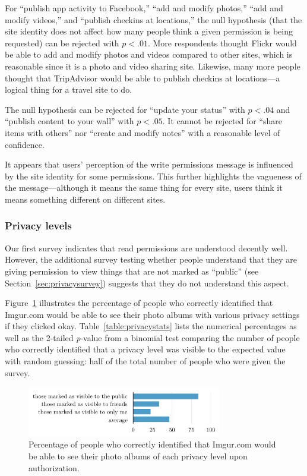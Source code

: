 \documentclass[10pt]{sig-alternate-10pt}
\begin{document}
For ``publish app activity to Facebook,'' ``add and modify photos,'' ``add and modify videos,'' and ``publish checkins at locations,'' the null hypothesis (that the site identity does not affect how many people think a given permission is being requested) can be rejected with $p < .01$. More respondents thought Flickr would be able to add and modify photos and videos compared to other sites, which is reasonable since it is a photo and video sharing site. Likewise, many more people thought that TripAdvisor would be able to publish checkins at locations---a logical thing for a travel site to do.

The null hypothesis can be rejected for ``update your status'' with $p < .04$ and ``publish content to your wall'' with $p < .05$. It cannot be rejected for ``share items with others'' nor ``create and modify notes'' with a reasonable level of confidence.

It appears that users' perception of the write permissions message is influenced by the site identity for some permissions. This further highlights the vagueness of the message---although it means the same thing for every site, users think it means something different on different sites.

\subsubsection{Privacy levels}

Our first survey indicates that read permissions are understood decently well. However, the additional survey testing whether people understand that they are giving permission to view things that are not marked as ``public'' (see Section~\ref{sec:privacysurvey}) suggests that they do not understand this aspect.

Figure~\ref{figure:privacypercents} illustrates the percentage of people who correctly identified that Imgur.com would be able to see their photo albums with various privacy settings if they clicked okay. Table~\ref{table:privacystats} lists the numerical percentages as well as the 2-tailed \emph{p}-value from a binomial test comparing the number of people who correctly identified that a privacy level was visible to the expected value with random guessing: half of the total number of people who were given the survey.

\begin{figure}[h!]
  \centering
  \includegraphics[width=8.5cm]{privacy_percents_cosn}
  \caption{Percentage of people who correctly identified that Imgur.com would be able to see their photo albums of each privacy level upon authorization.}
  \label{figure:privacypercents}
\end{figure}
\end{document}
